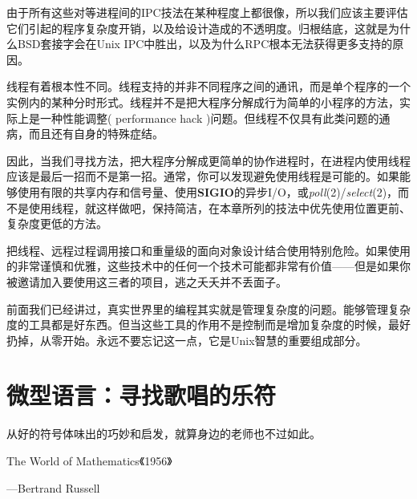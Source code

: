 \documentclass[12pt,oneside]{book}
\begin{document}
\begin{common-format}
由于所有这些对等进程间的IPC技法在某种程度上都很像，所以我们应该主要评估它们引起的程序复杂度开销，以及给设计造成的不透明度。归根结底，这就是为什么BSD套接字会在Unix IPC中胜出，以及为什么RPC根本无法获得更多支持的原因。

线程有着根本性不同。线程支持的并非不同程序之间的通讯，而是单个程序的一个实例内的某种分时形式。线程并不是把大程序分解成行为简单的小程序的方法，实际上是一种性能调整( performance hack )问题。但线程不仅具有此类问题的通病，而且还有自身的特殊症结。

因此，当我们寻找方法，把大程序分解成更简单的协作进程时，在进程内使用线程应该是最后一招而不是第一招。通常，你可以发现避免使用线程是可能的。如果能够使用有限的共享内存和信号量、使用\textbf{SIGIO}的异步I/O，或\textit{poll}(2)/\textit{select}(2)，而不是使用线程，就这样做吧，保持简洁，在本章所列的技法中优先使用位置更前、复杂度更低的方法。

把线程、远程过程调用接口和重量级的面向对象设计结合使用特别危险。如果使用的非常谨慎和优雅，这些技术中的任何一个技术可能都非常有价值——但是如果你被邀请加入要使用这三者的项目，逃之夭夭并不丢面子。

前面我们已经讲过，真实世界里的编程其实就是管理复杂度的问题。能够管理复杂度的工具都是好东西。但当这些工具的作用不是控制而是增加复杂度的时候，最好扔掉，从零开始。永远不要忘记这一点，它是Unix智慧的重要组成部分。


\chapter{微型语言：寻找歌唱的乐符}
\begin{flushright}
\begin{notecard}{23em}
从好的符号体味出的巧妙和启发，就算身边的老师也不过如此。
 
{\hfill  The World of Mathematics《1956》} 
 
{\hfill —Bertrand Russell}
\end{notecard}
\end{flushright}



\end{common-format}  
\end{document}
